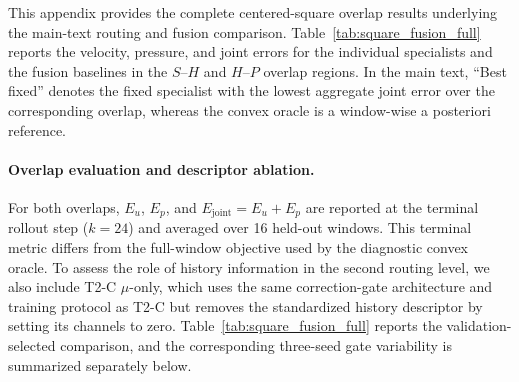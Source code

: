 \documentclass{article}
\begin{document}
This appendix provides the complete centered-square overlap results
underlying the main-text routing and fusion comparison. Table~\ref{tab:square_fusion_full} reports the velocity, pressure,
and joint errors for the individual specialists and the fusion baselines in the $S$--$H$ and $H$--$P$ overlap regions. In the main text, ``Best fixed'' denotes the fixed specialist with the
lowest aggregate joint error over the corresponding overlap, whereas the convex oracle is a window-wise a posteriori reference.



\paragraph{Overlap evaluation and descriptor ablation.}
For both overlaps, $E_u$, $E_p$, and $E_{\mathrm{joint}}=E_u+E_p$ are reported at the terminal rollout step ($k=24$) and averaged over 16 held-out windows.  This terminal metric differs from the full-window objective used by the diagnostic convex oracle. To assess the role of history information in the second routing level, we also include T2-C $\mu$-only, which uses the same correction-gate architecture and training protocol as T2-C but removes the standardized history descriptor by setting its channels to zero. Table~\ref{tab:square_fusion_full} reports the validation-selected comparison, and the corresponding three-seed gate variability is summarized separately below.

\par
\end{document}
